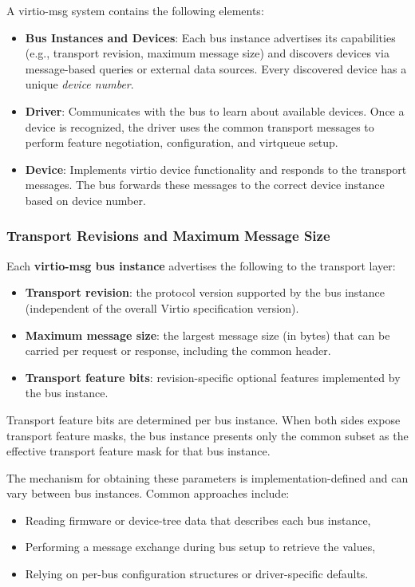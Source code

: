 A virtio-msg system contains the following elements:

\begin{itemize}
  \item \textbf{Bus Instances and Devices}: Each bus instance advertises its
        capabilities (e.g., transport revision, maximum message size) and
        discovers devices via message-based queries or external data sources.
        Every discovered device has a unique \emph{device number}.
  \item \textbf{Driver}: Communicates with the bus to learn about
        available devices. Once a device is recognized, the driver uses the
        common transport messages to perform feature negotiation, configuration,
        and virtqueue setup.
  \item \textbf{Device}: Implements virtio device functionality and
        responds to the transport messages. The bus forwards these messages to
        the correct device instance based on device number.
\end{itemize}

\subsubsection{Transport Revisions and Maximum Message Size}
\label{sec:Virtio Transport Options / Virtio Over Messages / Basic Concepts / Revisions}

Each \textbf{virtio-msg bus instance} advertises the following to the transport
layer:
\begin{itemize}
  \item \textbf{Transport revision}: the protocol version supported by the bus
        instance (independent of the overall Virtio specification version).
  \item \textbf{Maximum message size}: the largest message size (in bytes) that
        can be carried per request or response, including the common header.
  \item \textbf{Transport feature bits}: revision-specific optional features
        implemented by the bus instance.
\end{itemize}

Transport feature bits are determined per bus instance. When both sides expose
transport feature masks, the bus instance presents only the common subset as
the effective transport feature mask for that bus instance.

The mechanism for obtaining these parameters is implementation-defined and can
vary between bus instances. Common approaches include:
\begin{itemize}
  \item Reading firmware or device-tree data that describes each bus instance,
  \item Performing a message exchange during bus setup to retrieve the values,
  \item Relying on per-bus configuration structures or driver-specific defaults.
\end{itemize}

